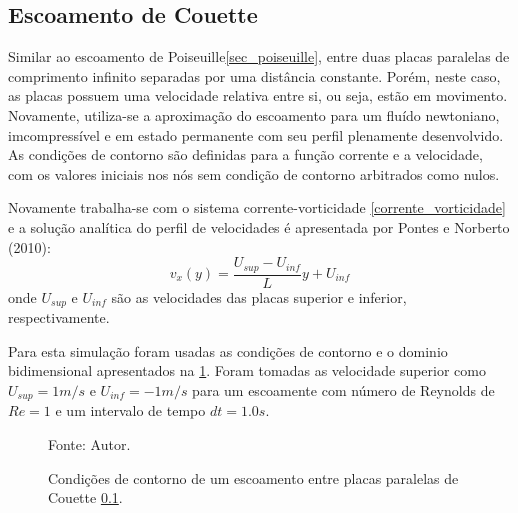 \subsection{\textbf{Escoamento de Couette}}
\label{sec_couette}
Similar ao escoamento de Poiseuille\ref{sec_poiseuille}, entre duas placas paralelas de comprimento infinito separadas por uma distância constante.
Porém, neste caso, as placas possuem uma velocidade relativa entre si, ou seja, estão em movimento.
Novamente, utiliza-se a aproximação do escoamento para um fluído newtoniano, imcompressível e em estado permanente com seu perfil plenamente desenvolvido.
As condições de contorno são definidas para a função corrente e a velocidade, com os valores iniciais nos nós sem condição de contorno arbitrados como nulos.

Novamente trabalha-se com o sistema corrente-vorticidade \ref{corrente_vorticidade} e a solução analítica do perfil de velocidades é apresentada por Pontes e Norberto (2010)\cite{pontes_norberto}:
\begin{equation}
    v_x(y) = \dfrac{U_{sup} - U_{inf}}{L}y + U_{inf}
    \label{couette_sol} 
\end{equation}
onde $U_{sup}$ e $U_{inf}$ são as velocidades das placas superior e inferior, respectivamente.

Para esta simulação foram usadas as condições de contorno e o dominio bidimensional apresentados na \ref{couette_bc}.
Foram tomadas as velocidade superior como $U_{sup}=1m/s$ e $U_{inf}=-1m/s$ para um escoamente com número de Reynolds de $Re=1$ e um intervalo de tempo $dt=1.0s$.
\begin{figure}[H]
    \centering
     {\raggedleft \scriptsize Fonte: Autor.}
    \caption{Condições de contorno de um escoamento entre placas paralelas de Couette \ref{sec_couette}.}
    \label{couette_bc}
\end{figure}

